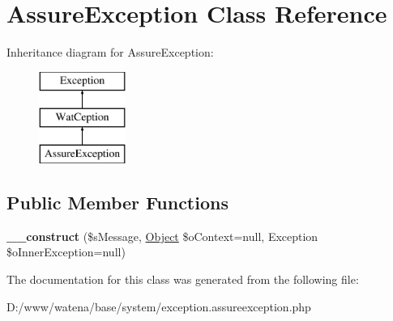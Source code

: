 \hypertarget{class_assure_exception}{\section{Assure\-Exception Class Reference}
\label{class_assure_exception}
}
Inheritance diagram for Assure\-Exception\-:\begin{figure}[H]
\begin{center}
\leavevmode
\includegraphics[height=3.000000cm]{class_assure_exception}
\end{center}
\end{figure}
\subsection*{Public Member Functions}
\begin{DoxyCompactItemize}
\item 
\hypertarget{class_assure_exception_a715976477632d2a6048be59b9dcf24fb}{{\bfseries \-\_\-\-\_\-construct} (\$s\-Message, \hyperlink{class_object}{Object} \$o\-Context=null, Exception \$o\-Inner\-Exception=null)}\label{class_assure_exception_a715976477632d2a6048be59b9dcf24fb}

\end{DoxyCompactItemize}


The documentation for this class was generated from the following file\-:\begin{DoxyCompactItemize}
\item 
D\-:/www/watena/base/system/exception.\-assureexception.\-php\end{DoxyCompactItemize}
